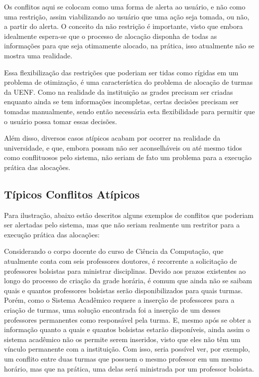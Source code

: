 Os conflitos aqui se colocam como uma forma de alerta ao usuário, e não como uma restrição, assim viabilizando ao usuário que uma ação seja tomada, ou não, a partir do alerta. O conceito da não restrição é importante, visto que embora idealmente espera-se que o processo de alocação disponha de todas as informações para que seja otimamente alocado, na prática, isso atualmente não se mostra uma realidade.

Essa flexibilização das restrições que poderiam ser tidas como rígidas em um problema de otimização, é uma característica do problema de alocação de turmas da UENF. Como na realidade da instituição as grades precisam ser criadas enquanto ainda se tem informações incompletas, certas decisões precisam ser tomadas manualmente, sendo então necessária esta flexibilidade para permitir que o usuário possa tomar essas decisões.

Além disso, diversos casos atípicos acabam por ocorrer na realidade da universidade, e que, embora possam não ser aconselháveis ou até mesmo tidos como conflituosos pelo sistema, não seriam de fato um problema para a execução prática das alocações.

\subsection{Típicos Conflitos Atípicos}

Para ilustração, abaixo estão descritos alguns exemplos de conflitos que poderiam ser alertadas pelo sistema, mas que não seriam realmente um restritor para a execução prática das alocações:

Considerando o corpo docente do curso de Ciência da Computação, que atualmente conta com seis professores doutores, é recorrente a solicitação de professores bolsistas para ministrar disciplinas. Devido aos prazos existentes ao longo do processo de criação da grade horária, é comum que ainda não se saibam quais e quantos professores bolsistas serão disponibilizados para quais turmas. Porém, como o Sistema Acadêmico requere a inserção de professores para a criação de turmas, uma solução encontrada foi a inserção de um desses professores permanentes como responsável pela turma. E, mesmo após se obter a informação quanto a quais e quantos bolsistas estarão disponíveis, ainda assim o sistema acadêmico não os permite serem inseridos, visto que eles não têm um vínculo permanente com a instituição. Com isso, seria possível ver, por exemplo, um conflito entre duas turmas que possuem o mesmo professor em um mesmo horário, mas que na prática, uma delas será ministrada por um professor bolsista.

